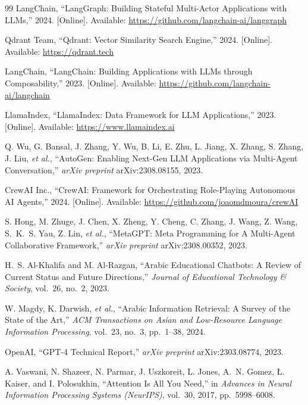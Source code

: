 \begin{thebibliography}{99}
\textenglish{LangChain, ``LangGraph: Building Stateful Multi-Actor Applications with LLMs,'' 2024. [Online]. Available: \url{https://github.com/langchain-ai/langgraph}}

\textenglish{Qdrant Team, ``Qdrant: Vector Similarity Search Engine,'' 2024. [Online]. Available: \url{https://qdrant.tech}}

\textenglish{LangChain, ``LangChain: Building Applications with LLMs through Composability,'' 2023. [Online]. Available: \url{https://github.com/langchain-ai/langchain}}

\textenglish{LlamaIndex, ``LlamaIndex: Data Framework for LLM Applications,'' 2023. [Online]. Available: \url{https://www.llamaindex.ai}}

\textenglish{Q. Wu, G. Bansal, J. Zhang, Y. Wu, B. Li, E. Zhu, L. Jiang, X. Zhang, S. Zhang, J. Liu, \textit{et al.}, ``AutoGen: Enabling Next-Gen LLM Applications via Multi-Agent Conversation,'' \textit{arXiv preprint} arXiv:2308.08155, 2023.}

\textenglish{CrewAI Inc., ``CrewAI: Framework for Orchestrating Role-Playing Autonomous AI Agents,'' 2024. [Online]. Available: \url{https://github.com/joaomdmoura/crewAI}}

\textenglish{S. Hong, M. Zhuge, J. Chen, X. Zheng, Y. Cheng, C. Zhang, J. Wang, Z. Wang, S.~K.~S. Yau, Z. Lin, \textit{et al.}, ``MetaGPT: Meta Programming for A Multi-Agent Collaborative Framework,'' \textit{arXiv preprint} arXiv:2308.00352, 2023.}

\textenglish{H.~S. Al-Khalifa and M. Al-Razgan, ``Arabic Educational Chatbots: A Review of Current Status and Future Directions,'' \textit{Journal of Educational Technology \& Society}, vol.~26, no.~2, 2023.}

\textenglish{W. Magdy, K. Darwish, \textit{et al.}, ``Arabic Information Retrieval: A Survey of the State of the Art,'' \textit{ACM Transactions on Asian and Low-Resource Language Information Processing}, vol.~23, no.~3, pp.~1--38, 2024.}

\textenglish{OpenAI, ``GPT-4 Technical Report,'' \textit{arXiv preprint} arXiv:2303.08774, 2023.}

\textenglish{A. Vaswani, N. Shazeer, N. Parmar, J. Uszkoreit, L. Jones, A.~N. Gomez, {\L}. Kaiser, and I. Polosukhin, ``Attention Is All You Need,'' in \textit{Advances in Neural Information Processing Systems (NeurIPS)}, vol.~30, 2017, pp.~5998--6008.}


\end{thebibliography}
